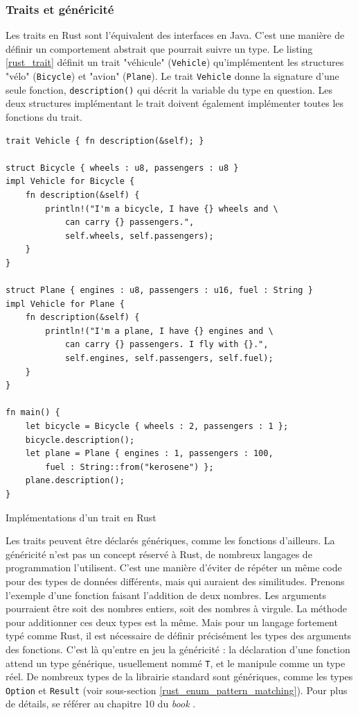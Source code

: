 \subsubsection{Traits et généricité}\label{trait_generic}
Les traits en Rust sont l'équivalent des interfaces en Java. C'est une manière de définir 
un comportement abstrait que pourrait suivre un type. Le listing \ref{rust_trait} définit 
un trait "véhicule" (\texttt{Vehicle}) qu'implémentent les structures "vélo" 
(\texttt{Bicycle}) et "avion" (\texttt{Plane}). Le trait 
\texttt{Vehicle} donne la signature d'une seule fonction, \texttt{description()} 
qui décrit la variable du type en question. Les deux structures implémentant le trait doivent également 
implémenter toutes les fonctions du trait.
\bigbreak
\begin{code}
    \begin{verbatim}
trait Vehicle { fn description(&self); }

struct Bicycle { wheels : u8, passengers : u8 }
impl Vehicle for Bicycle {
    fn description(&self) {
        println!("I'm a bicycle, I have {} wheels and \
            can carry {} passengers.", 
            self.wheels, self.passengers);
    }
}

struct Plane { engines : u8, passengers : u16, fuel : String }
impl Vehicle for Plane {
    fn description(&self) {
        println!("I'm a plane, I have {} engines and \
            can carry {} passengers. I fly with {}.", 
            self.engines, self.passengers, self.fuel);
    }
}

fn main() {
    let bicycle = Bicycle { wheels : 2, passengers : 1 };
    bicycle.description();
    let plane = Plane { engines : 1, passengers : 100, 
        fuel : String::from("kerosene") };
    plane.description();
}
    \end{verbatim}
    \caption{Implémentations d'un trait en Rust}
    \label{rust_trait}
\end{code}
\bigbreak
Les traits peuvent être déclarés génériques, comme les fonctions d'ailleurs. La généricité 
n'est pas un concept réservé à Rust, de nombreux langages de programmation l'utilisent. C'est une 
manière d'éviter de répéter un même code pour des types de données différents, mais qui auraient 
des similitudes. Prenons l'exemple d'une fonction faisant l'addition de deux nombres. Les arguments 
pourraient être soit des nombres entiers, soit des nombres à virgule. La méthode pour additionner 
ces deux types est la même. Mais pour un langage fortement typé comme Rust, il est nécessaire de 
définir précisément les types des arguments des fonctions. C'est là qu'entre en jeu la généricité : 
la déclaration d'une fonction attend un type générique, usuellement nommé \texttt{T}, 
et le manipule comme un type réel. De nombreux types de la librairie standard sont génériques, 
comme les types \texttt{Option} et \texttt{Result} (voir sous-section 
\ref{rust_enum_pattern_matching}).
Pour plus de détails, se référer au chapitre 10 du \textit{book} \cite{ref0}.

